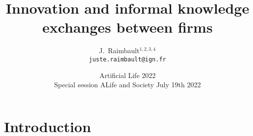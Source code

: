 \documentclass[english,11pt]{beamer}
\newcommand{\sframe}[2]{\frame{\frametitle{#1} #2}}
\begin{document}
\title{Innovation and informal knowledge exchanges between firms}

\author{J.~Raimbault$^{1,2,3,4}$\\
\texttt{juste.raimbault@ign.fr}
}




\date{Artificial Life 2022\\
Special session ALife and Society
July 19th 2022
}




\frame{\maketitle}


\section{Introduction}


\sframe{}{




}
\end{document}
